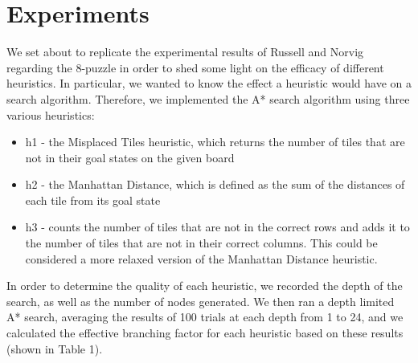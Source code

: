 
\section{Experiments}
\label{sec:expts}


We set about to replicate the experimental results of Russell and
Norvig regarding the 8-puzzle in order to shed some light on the
efficacy of different heuristics. In particular, we wanted to know the
effect a heuristic would have on a search algorithm. Therefore, we
implemented the A* search algorithm using three various heuristics:

\begin{itemize}
  \item h1 - the Misplaced Tiles heuristic, which returns the number
    of tiles that are not in their goal states on the given board
  \item h2 - the Manhattan Distance, which is defined as the sum of
    the distances of each tile from its goal state
  \item h3 - counts the number of tiles that are not in the correct
    rows and adds it to the number of tiles that are not in their
    correct columns. This could be considered a more relaxed version
    of the Manhattan Distance heuristic. 
\end{itemize}

In order to determine the quality of each heuristic, we recorded the
depth of the search, as well as the number of nodes generated. We then
ran a depth limited A* search, averaging the results of 100 trials at
each depth from 1 to 24, and we calculated the effective
branching factor for each heuristic based on these results (shown in
Table 1).  






